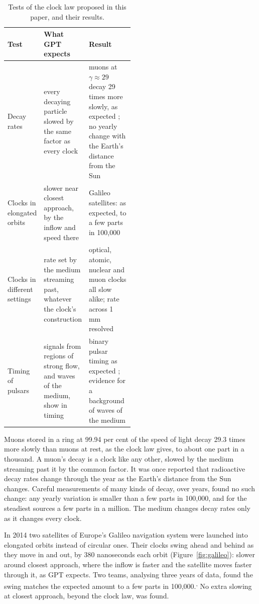 \begin{table}[t]\centering\small
\caption{Tests of the clock law proposed in this paper, and their results.}
\begin{tabularx}{\linewidth}{@{}>{\raggedright}p{0.2\linewidth} >{\raggedright}p{0.3\linewidth} X@{}}\toprule
\textbf{Test} & \textbf{What GPT expects} & \textbf{Result}\\\midrule
Decay rates & every decaying particle slowed by the same factor as every clock & muons at $\gamma \approx 29$ decay 29 times more slowly, as expected \citep{bailey1977}; no yearly change with the Earth's distance from the Sun \citep{pomme2016}\\
Clocks in elongated orbits & slower near closest approach, by the inflow and speed there & Galileo satellites: as expected, to a few parts in 100,000 \citep{delva2018,herrmann2018}\\
Clocks in different settings & rate set by the medium streaming past, whatever the clock's construction & optical, atomic, nuclear and muon clocks all slow alike; rate across 1 mm resolved \citep{bothwell2022}\\
Timing of pulsars & signals from regions of strong flow, and waves of the medium, show in timing & binary pulsar timing as expected \citep{weisberg2016,kramer2021}; evidence for a background of waves of the medium \citep{agazie2023}\\\bottomrule
\end{tabularx}\label{tab:tests}\end{table}

 Muons stored in a ring at 99.94 per cent of the speed of light decay 29.3 times more slowly than muons at rest, as the clock law gives, to about one part in a thousand. A muon's decay is a clock like any other, slowed by the medium streaming past it by the common factor. It was once reported that radioactive decay rates change through the year as the Earth's distance from the Sun changes. Careful measurements of many kinds of decay, over years, found no such change: any yearly variation is smaller than a few parts in 100,000, and for the steadiest sources a few parts in a million. The medium changes decay rates only as it changes every clock.

 In 2014 two satellites of Europe's Galileo navigation system were launched into elongated orbits instead of circular ones. Their clocks swing ahead and behind as they move in and out, by 380 nanoseconds each orbit (Figure~\ref{fig:galileo}): slower around closest approach, where the inflow is faster and the satellite moves faster through it, as GPT expects. Two teams, analysing three years of data, found the swing matches the expected amount to a few parts in 100,000.\textsuperscript{,} No extra slowing at closest approach, beyond the clock law, was found.

